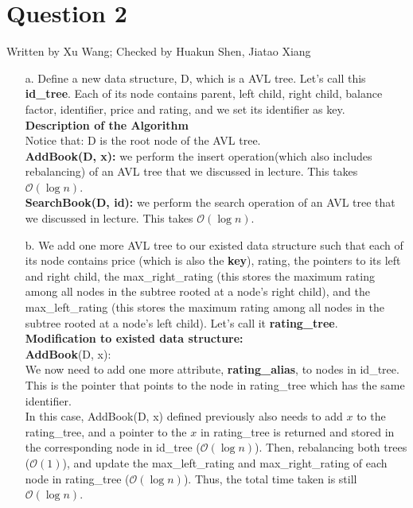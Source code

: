 \documentclass[10pt]{article}
\begin{document}
\section*{Question 2} Written by Xu Wang; Checked by Huakun Shen, Jiatao Xiang\\
\begin{enumerate}
\item[a.]
Define a new data structure, D, which is a AVL tree. Let's call this \textbf{id\_tree}. Each of its node contains parent, left child, right child, balance factor, identifier, price and rating, and we set its identifier as key.\\
\textbf{Description of the Algorithm}\\
Notice that: D is the root node of the AVL tree.\\
\textbf{AddBook(D, x):} we perform the insert operation(which also includes rebalancing) of an AVL tree that we discussed in lecture. This takes $\mathcal{O}(\log{}n)$.\\
\textbf{SearchBook(D, id):} we perform the search operation of an AVL tree that we discussed in lecture. This takes $\mathcal{O}(\log{}n)$.\\
\item[b.]
We add one more AVL tree to our existed data structure such that each of its node contains price (which is also the \textbf{key}), rating, the pointers to its left and right child, the max\_right\_rating (this stores the maximum rating among all nodes in the subtree rooted at a node's right child), and the max\_left\_rating (this stores the maximum rating among all nodes in the subtree rooted at a node's left child). Let's call it \textbf{rating\_tree}.\\
\textbf{Modification to existed data structure:}\\
\textbf{AddBook}(D, x):\\
We now need to add one more attribute, \textbf{rating\_alias}, to nodes in id\_tree. This is the pointer that points to the node in rating\_tree which has the same identifier.\\
In this case, AddBook(D, x) defined previously also needs to add $x$ to the rating\_tree, and a pointer to the $x$ in rating\_tree is returned and stored in the corresponding node in id\_tree ($\mathcal{O}(\log{}n)$). Then, rebalancing both trees ($\mathcal{O}(1)$), and update the max\_left\_rating and max\_right\_rating of each node in rating\_tree ($\mathcal{O}(\log{}n)$). Thus, the total time taken is still $\mathcal{O}(\log{}n)$.\\

\end{enumerate}
\end{document}
